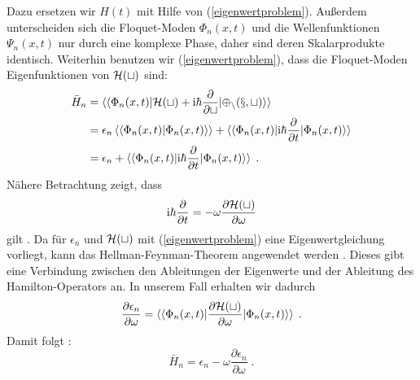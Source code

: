     Dazu ersetzen wir $H(t)$ mit Hilfe von (\ref{eigenwertproblem}).
    Außerdem unterscheiden sich die Floquet-Moden $\Phi_n(x,t)$ und die Wellenfunktionen $\Psi_n(x,t)$ nur durch eine komplexe Phase, daher sind deren Skalarprodukte identisch.
    Weiterhin benutzen wir (\ref{eigenwertproblem}), dass die Floquet-Moden Eigenfunktionen von $\cal{H}(t)$ sind:
    \begin{align}
      \begin{split}
      \bar{H}_n  &= \braket{\braket{\Phi_n(x,t)|\cal{H}(t)+\text{i}\hbar\frac{\partial}{\partial t}|\Phi_n(x,t)}} \\
      &=\epsilon_n \braket{\braket{\Phi_n(x,t)|\Phi_n(x,t)}} + \braket{\braket{\Phi_n(x,t)|\text{i}\hbar\frac{\partial}{\partial t}|\Phi_n(x,t)}} \\
      &= \epsilon_n + \braket{\braket{\Phi_n(x,t)|\text{i}\hbar\frac{\partial}{\partial t}|\Phi_n(x,t)}} \; .
    \end{split}
    \end{align}
    Nähere Betrachtung zeigt, dass
    \begin{equation}
      \text{i}\hbar\frac{\partial}{\partial t} = -\omega \frac{\partial \cal{H}(t)}{\partial \omega}
    \end{equation}
    gilt \cite{haengi}.
    Da für $\epsilon_n$ und $\cal H(t)$ mit (\ref{eigenwertproblem}) eine Eigenwertgleichung vorliegt, kann das Hellman-Feynman-Theorem angewendet werden \cite{hellmann}.
    Dieses gibt eine Verbindung zwischen den Ableitungen der Eigenwerte und der Ableitung des Hamilton-Operators an.
    In unserem Fall erhalten wir dadurch
    \begin{equation}
      \frac{\partial \epsilon_n}{\partial \omega} = \braket{\braket{\Phi_n(x,t)|\frac{\partial \cal H(t)}{\partial \omega}|\Phi_n(x,t)}} \; .
    \end{equation}
    Damit folgt \cite{haengi}:
    \begin{equation}
      \bar{H}_n = \epsilon_n - \omega\frac{\partial \epsilon_n}{\partial \omega} \; .
      \label{mittleres_H}
    \end{equation}































  
